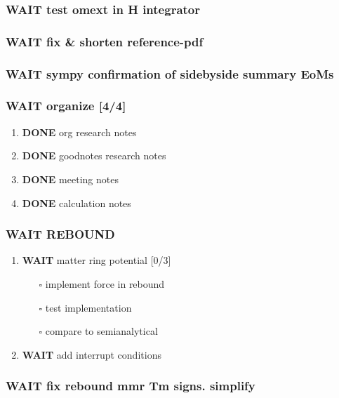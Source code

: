\documentclass[11pt]{article}
\begin{document}
\subsubsection{{\bfseries\sffamily WAIT} test omext in H integrator}
\label{sec:org9a1a2e8}
\subsubsection{{\bfseries\sffamily WAIT} fix \& shorten reference-pdf}
\label{sec:org01489cc}
\subsubsection{{\bfseries\sffamily WAIT} sympy confirmation of sidebyside summary EoMs}
\label{sec:org7465e00}
\subsubsection{{\bfseries\sffamily WAIT} organize [4/4]}
\label{sec:org0c96ce4}
\begin{enumerate}
\item {\bfseries\sffamily DONE} org research notes
\label{sec:org75fdaeb}
\item {\bfseries\sffamily DONE} goodnotes research notes
\label{sec:org036ccb4}
\item {\bfseries\sffamily DONE} meeting notes
\label{sec:orgd131d97}
\item {\bfseries\sffamily DONE} calculation notes
\label{sec:orgcda61cf}
\end{enumerate}
\subsubsection{{\bfseries\sffamily WAIT} REBOUND}
\label{sec:org348f039}
\begin{enumerate}
\item {\bfseries\sffamily WAIT} matter ring potential [0/3]
\label{sec:org98738da}
\begin{itemize}
\item[{$\square$}] implement force in rebound
\item[{$\square$}] test implementation
\item[{$\square$}] compare to semianalytical
\end{itemize}
\item {\bfseries\sffamily WAIT} add interrupt conditions
\label{sec:org2e36610}
\end{enumerate}
\subsubsection{{\bfseries\sffamily WAIT} fix rebound mmr Tm signs. simplify}
\label{sec:org7b3c627}
\end{document}
